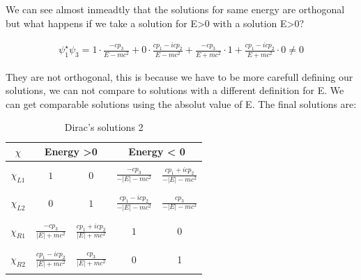We can see almost inmeadtly that the solutions for same energy are orthogonal but what happens if we take a solution for E>0 with a solution E>0?

\begin{equation}
  \begin{array}{c}
    \psi_1^\star\psi_3 = 1 \cdot \frac{-cp_3}{E-mc^2} + 0 \cdot \frac{cp_1-icp_2}{E-mc^2} + \frac{-cp_3}{E+mc^2} \cdot 1 + \frac{cp_1-icp_2}{E+mc^2} \cdot 0 \neq 0
  \end{array}
\end{equation}

They are not orthogonal, this is because we have to be more carefull defining our solutions, we can not compare to solutions with a different definition for E. We can get comparable solutions using the absolut value of E. The final solutions are:

\begin{table}[H]
  \begin{tabular}{|c|c|c|c|c|}
    \hline

    $\chi$ & \multicolumn{2}{|c|}{Energy >0} & \multicolumn{2}{|c|}{Energy < 0}\\
    \hline
    & & & &\\
    $\chi_{L1}$ & $1$                         & $0$                             & $\frac{-cp_3}{-|E|-mc^2}$            & $\frac{cp_1 +icp_2}{-|E|-mc^2}$ \\
    & & & &\\
    \hline
    & & & &\\
    $\chi_{L2}$& $0$                          & $1$                             & $\frac{cp_1 -icp_2}{-|E|-mc^2}$      & $\frac{cp_3}{-|E|-mc^2}$ \\
    & & & &\\
    \hline
    & & & &\\
    $\chi_{R1}$ & $\frac{-cp_3}{|E|+mc^2}$      & $\frac{cp_1+icp_2}{|E|+mc^2}$     & $1$                               & 0 \\
    & & & &\\
    \hline
    & & & &\\
    $\chi_{R2}$ & $\frac{cp_1-icp_2}{|E|+mc^2}$ & $\frac{cp_3}{|E|+mc^2}$           & $0$                               & 1 \\
    & & & &\\
    \hline
  \end{tabular}
  \caption{Dirac's solutions 2}
\end{table}

